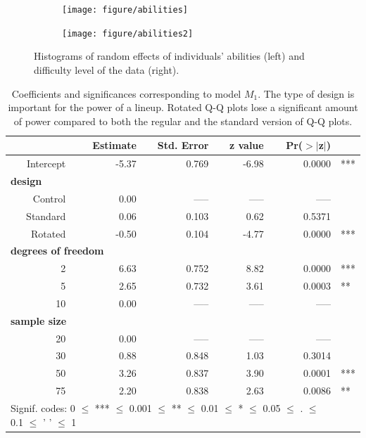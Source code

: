 \documentclass{article}\usepackage[]{graphicx}\usepackage[]{color}
\newenvironment{knitrout}{}{} %
\begin{document}
\begin{figure}
\begin{subfigure}[b]{0.5\textwidth}
\begin{knitrout}
\color{fgcolor}
\texttt{[image: figure/abilities]} 

\end{knitrout}

\end{subfigure}
\begin{subfigure}[b]{0.5\textwidth}
\begin{knitrout}
\color{fgcolor}
\texttt{[image: figure/abilities2]} 

\end{knitrout}

\end{subfigure}
\caption{\label{fig:ranef}Histograms of random effects of individuals' abilities (left) and difficulty level of the data (right). }
\end{figure}

\begin{table}[ht]
\centering
\caption{\label{tab:model} Coefficients and significances corresponding to  model $M_1$. The type of design is important for the power of a lineup. Rotated Q-Q plots lose a significant amount of power compared to both the regular and the standard version of Q-Q plots. }
\begin{tabular}{rrrrrl}
  \hline
 &\bf Estimate &\bf Std. Error &\bf z value &\bf Pr($>$$|$z$|$) & \\ 
  \hline
  Intercept &  -5.37 & 0.769 & -6.98 & 0.0000  & *** \\ [3pt]
\multicolumn{3}{l}{\bf design} \\
   Control & 0.00 & ----- & ----- & ----- \\ 
   Standard & 0.06 & 0.103 & 0.62 & 0.5371 \\
   Rotated & -0.50 & 0.104 & -4.77 & 0.0000 & ***\\  [3pt]
\multicolumn{4}{l}{\bf degrees of freedom} \\
  2 & 6.63 & 0.752 & 8.82 & 0.0000 & ***\\ 
  5 & 2.65 & 0.732 & 3.61 & 0.0003 & **\\ 
  10 & 0.00 & ----- & ----- & ----- \\ [3pt]
\multicolumn{3}{l}{\bf sample size} \\
  20 & 0.00 & ----- & ----- & ----- \\ 
  30 & 0.88 & 0.848 & 1.03 & 0.3014 \\ 
  50  & 3.26 & 0.837 & 3.90 & 0.0001 & ***\\ 
  75 & 2.20 & 0.838 & 2.63 & 0.0086  & **\\ 
   \hline
\multicolumn{5}{l}{Signif. codes:  0 $\le$ *** $\le$ 0.001 $\le$ ** $\le$ 0.01 $\le$ * $\le$ 0.05 $\le$ . $\le$ 0.1 $\le$ ' ' $\le$ 1}
\end{tabular}
\end{table}
\end{document}
